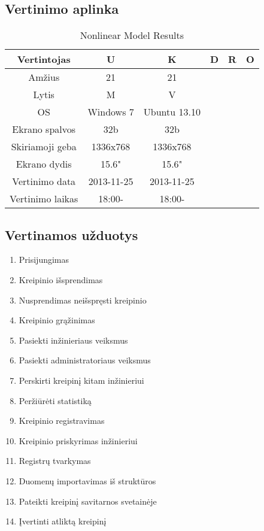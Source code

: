\subsection{Vertinimo aplinka}
	\begin{table}[ht] 
	\caption{Nonlinear Model Results} %
	\centering %
	\begin{tabular}{c c c c c c} %
	\hline\hline %
	Vertintojas & U & K & D & R & O \\ [0.5ex] %
	\hline %
	Amžius & 21 & 21\\ %
	Lytis & M & V\\
	OS & Windows 7 & Ubuntu 13.10\\
	Ekrano spalvos & 32b & 32b\\
	Skiriamoji geba & 1336x768 & 1336x768\\
	Ekrano dydis & 15.6" & 15.6"\\
	Vertinimo data & 2013-11-25 & 2013-11-25\\
	Vertinimo laikas & 18:00- & 18:00-\\
	\hline %
	\end{tabular} 
	\label{table:nonlin} %
	\end{table} 
	
\subsection{Vertinamos užduotys}
	\begin{enumerate}
	\item Prisijungimas
	\item Kreipinio išsprendimas
	\item Nusprendimas neišspręsti kreipinio
	\item Kreipinio grąžinimas
	\item Pasiekti inžinieriaus veiksmus
	\item Pasiekti administratoriaus veiksmus
	\item Perskirti kreipinį kitam inžinieriui
	\item Peržiūrėti statistiką
	\item Kreipinio registravimas
	\item Kreipinio priskyrimas inžinieriui
	\item Registrų tvarkymas
	\item Duomenų importavimas iš struktūros
	\item Pateikti kreipinį savitarnos svetainėje
	\item Įvertinti atliktą kreipinį
	\end{enumerate}
	
